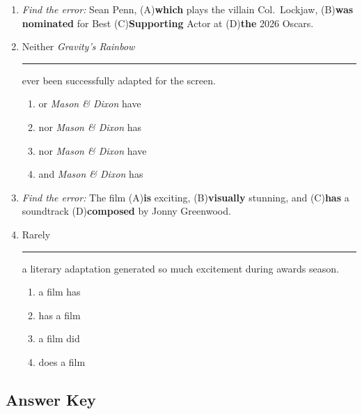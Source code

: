 \documentclass[10pt,a4paper]{article}
\begin{document}
\begin{enumerate}[label=\textbf{\arabic*.}, leftmargin=*]
\item \textit{Find the error:}
Sean Penn, (A)\textbf{which} plays the villain Col.\ Lockjaw,
(B)\textbf{was nominated} for Best (C)\textbf{Supporting} Actor at
(D)\textbf{the} 2026 Oscars.

\item Neither \emph{Gravity's Rainbow} \rule{2cm}{0.4pt} ever been
successfully adapted for the screen.
\begin{enumerate}[label=(\Alph*)]
\item or \emph{Mason \& Dixon} have
\item nor \emph{Mason \& Dixon} has
\item nor \emph{Mason \& Dixon} have
\item and \emph{Mason \& Dixon} has
\end{enumerate}

\item \textit{Find the error:}
The film (A)\textbf{is} exciting, (B)\textbf{visually} stunning,
and (C)\textbf{has} a soundtrack (D)\textbf{composed} by Jonny
Greenwood.

\item Rarely \rule{2cm}{0.4pt} a literary adaptation generated so
much excitement during awards season.
\begin{enumerate}[label=(\Alph*)]
\item a film has \item has a film \item a film did \item does a film
\end{enumerate}

\end{enumerate}

\subsection*{Answer Key}
\end{document}
